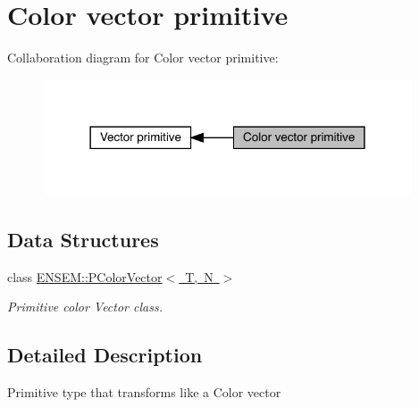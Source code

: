 \hypertarget{group__primcolorvector}{}\section{Color vector primitive}
\label{group__primcolorvector}
Collaboration diagram for Color vector primitive\+:\nopagebreak
\begin{figure}[H]
\begin{center}
\leavevmode
\includegraphics[width=310pt]{d4/d86/group__primcolorvector}
\end{center}
\end{figure}
\subsection*{Data Structures}
\begin{DoxyCompactItemize}
\item 
class \mbox{\hyperlink{classENSEM_1_1PColorVector}{E\+N\+S\+E\+M\+::\+P\+Color\+Vector$<$ T, N $>$}}
\begin{DoxyCompactList}\small\item\em Primitive color Vector class. \end{DoxyCompactList}\end{DoxyCompactItemize}


\subsection{Detailed Description}
Primitive type that transforms like a Color vector 